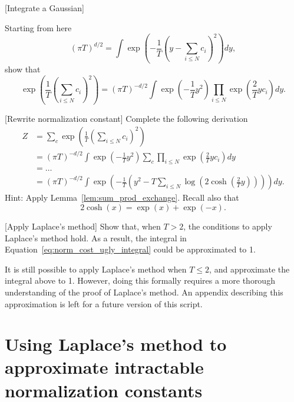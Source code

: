 \begin{exercise}{[Integrate a Gaussian]}

Starting from here
%
\begin{equation}
\left(\pi T\right)^{d/2} = \int \exp\left(-\frac{1}{T}\left(y - \sum_{i \leq N}c_i\right)^2\right)dy,
\end{equation}
%
show that
%
\begin{equation}
\exp\left(\frac{1}{T}\left(\sum_{i \leq N}c_i\right)^2\right) = \left(\pi T\right)^{-d/2}\int\exp\left(-\frac{1}{T}y^2\right) \prod_{i \leq N}\exp\left(\frac{2}{T}y c_i\right) dy.
\end{equation}
%
\end{exercise}

\begin{exercise}{[Rewrite normalization constant]}
Complete the following derivation
%
\begin{align}
Z &= \sum_{c} \exp\left(\frac{1}{T}\left(\sum_{i \leq N}c_i\right)^2\right)\\
&= \left(\pi T\right)^{-d/2}\int\exp\left(-\frac{1}{T}y^2\right) \sum_{c}\prod_{i \leq N}\exp\left(\frac{2}{T}yc_i\right) dy\\
&= \ldots \\
&= \left(\pi T\right)^{-d/2}\int \exp\left(-\frac{1}{T}\left(y^2 - T \sum_{i \leq N} \log \left(2 \cosh\left(\frac{2}{T}y\right)\right)\right)\right) dy.\label{eq:norm_cost_ugly_integral}
\end{align}
%
Hint: Apply Lemma~\ref{lem:sum_prod_exchange}. Recall also that
%
\begin{equation}
2 \cosh(x) = \exp(x) + \exp(-x).
\end{equation}
%
\end{exercise}

\begin{exercise}{[Apply Laplace's method]}
Show that, when $T > 2$, the conditions to apply Laplace's method hold. As a result, the integral in Equation~\ref{eq:norm_cost_ugly_integral} could be approximated to 1.
\end{exercise}

It is still possible to apply Laplace's method when $T \leq 2$, and approximate the integral above to 1. However, doing this formally requires a more thorough understanding of the proof of Laplace's method. An appendix describing this approximation is left for a future version of this script.

\section{Using Laplace's method to approximate intractable normalization constants}
\label{sec:laplace_recipe}

